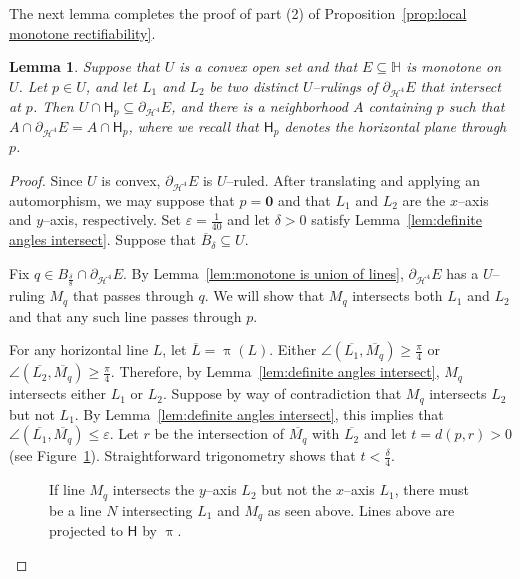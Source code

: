 \documentclass[11pt,reqno]{amsart}
\renewcommand{\H}{\mathbb{H}}
\newcommand{\cH}{\mathcal{H}}
\renewcommand{\epsilon}{\varepsilon}
\newcommand{\0}{\mathbf{0}}
\renewcommand{\1}{\mathbf 1}
\renewcommand{\subset}{\subseteq}
\renewcommand{\ge}{\geqslant}
\renewcommand{\le}{\leqslant}
\newtheorem{lemma}[thm]{Lemma}
\theoremstyle{remark}
\begin{document}
The next lemma completes the proof of part (2) of Proposition~\ref{prop:local monotone rectifiability}.
\begin{lemma}\label{lem:intersecting lines and horizontal planes}
  Suppose that $U$ is a convex open set and that $E\subset \H$ is monotone on $U$.  Let $p\in U$, and let $L_1$ and $L_2$ be two distinct $U$--rulings of $\partial_{\cH^4} E$ that intersect at $p$. Then $U\cap \mathsf{H}_p\subset \partial_{\cH^4} E$, and there is a neighborhood $A$ containing $p$ such that $A\cap \partial_{\cH^4} E=A\cap \mathsf{H}_p$, where we recall that $\mathsf{H}_p$ denotes  the horizontal plane through $p$.
\end{lemma}
\begin{proof}
  Since $U$ is convex, $\partial_{\cH^4} E$ is $U$--ruled.
  After translating and applying an automorphism, we may suppose that $p=\mathbf{0}$ and that $L_1$ and $L_2$ are the $x$--axis and $y$--axis, respectively. Set $\epsilon=\frac{1}{40}$ and let $\delta>0$ satisfy Lemma~\ref{lem:definite angles intersect}. Suppose that $\overline{B}_\delta\subset U$.

  Fix $q\in B_{\frac{\delta}{8}}\cap \partial_{\cH^4} E$.  By Lemma~\ref{lem:monotone is union of lines}, $\partial_{\cH^4} E $ has a $U$--ruling $M_q$ that passes through $q$.  We will show that $M_q$ intersects both $L_1$ and $L_2$ and that any such line passes through $p$.

  For any horizontal line $L$, let $\overline{L}=\uppi(L)$.  Either $\angle(\overline{L_1},\overline{M_q})\ge \frac{\pi}{4}$ or $\angle(\overline{L_2},\overline{M_q})\ge \frac{\pi}{4}$. Therefore, by Lemma~\ref{lem:definite angles intersect}, $M_q$ intersects either $L_1$ or $L_2$.  Suppose by way of contradiction that $M_q$ intersects $L_2$ but not $L_1$.  By Lemma~\ref{lem:definite angles intersect}, this implies that $\angle(\overline{L_1},\overline{M_q})\le \epsilon$.  Let $r$ be the intersection of $\overline{M_q}$ with $\overline{L_2}$ and let $t=d(p,r)>0$ (see Figure~\ref{fig:line intersects L2}).  Straightforward trigonometry shows that $t<\frac{\delta}{4}$.

  \begin{figure}[h]
    \begin{centering}
      
    \end{centering}
    \caption{If line $M_q$ intersects the $y$--axis $L_2$ but not the $x$--axis $L_1$, there must be a line $N$ intersecting $L_1$ and $M_q$ as seen above.  Lines above are projected to $\mathsf{H}$ by $\uppi$. \label{fig:line intersects L2}}
  \end{figure}


\end{proof}
\end{document}
